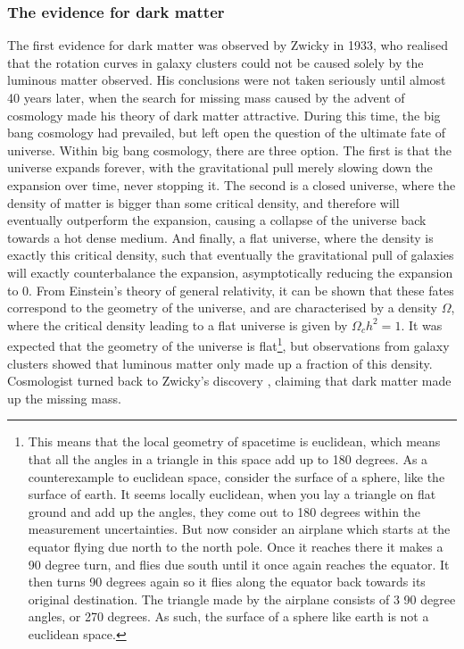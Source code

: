 \subsubsection{The evidence for dark matter}
The first evidence for dark matter was observed by Zwicky \cite{Zwicky} in 1933, who realised that the rotation curves in galaxy clusters could not be caused solely by the luminous matter observed. His conclusions were not taken seriously until almost 40 years later, when the search for missing mass caused by the advent of cosmology made his theory of dark matter attractive. During this time, the big bang cosmology had prevailed, but left open the question of the ultimate fate of universe. Within big bang cosmology, there are three option. The first is that the universe expands forever, with the gravitational pull merely slowing down the expansion over time, never stopping it. The second is a closed universe, where the density of matter is bigger than some critical density, and therefore will eventually outperform the expansion, causing a collapse of the universe back towards a hot dense medium. And finally, a flat universe, where the density is exactly this critical density, such that eventually the gravitational pull of galaxies will exactly counterbalance the expansion, asymptotically reducing the expansion to 0. From Einstein's theory of general relativity, it can be shown that these fates correspond to the geometry of the universe, and are characterised by a density $\Omega$, where the critical density leading to a flat universe is given by $\Omega_c h^2= 1$\cite{PDG2022, Planck2020}. It was expected that the geometry of the universe is flat\footnote{This means that the local geometry of spacetime is euclidean, which means that all the angles in a triangle in this space add up to 180 degrees. As a counterexample to euclidean space, consider the surface of a sphere, like the surface of earth. It seems locally euclidean, when you lay a triangle on flat ground and add up the angles, they come out to 180 degrees within the measurement uncertainties. But now consider an airplane which starts at the equator flying due north to the north pole. Once it reaches there it makes a 90 degree turn, and flies due south until it once again reaches the equator. It then turns 90 degrees again so it flies along the equator back towards its original destination. The triangle made by the airplane consists of 3 90 degree angles, or 270 degrees. As such, the surface of a sphere like earth is not a euclidean space.}, but observations from galaxy clusters showed that luminous matter only made up a fraction of this density\cite{Planck2020}.%
Cosmologist turned back to Zwicky's discovery \cite{history_of_dark_matter, Ostriker_return_to_DM}, claiming that dark matter made up the missing mass. \\

